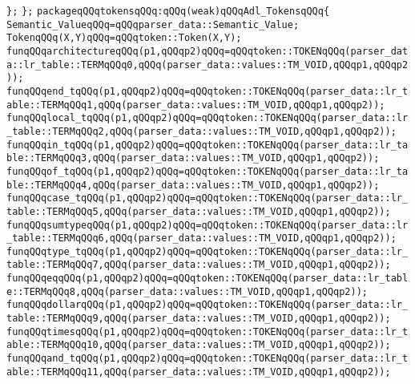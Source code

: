 \verb|};|\newline
\verb|};|\newline
\verb|packageqQQqtokensqQQq:qQQq(weak)qQQqAdl_TokensqQQq{|\newline
\verb|Semantic_ValueqQQq=qQQqparser_data::Semantic_Value;|\newline
\verb|TokenqQQq(X,Y)qQQq=qQQqtoken::Token(X,Y);|\newline
\verb|funqQQqarchitectureqQQq(p1,qQQqp2)qQQq=qQQqtoken::TOKENqQQq(parser_data::lr_table::TERMqQQq0,qQQq(parser_data::values::TM_VOID,qQQqp1,qQQqp2));|\newline
\verb|funqQQqend_tqQQq(p1,qQQqp2)qQQq=qQQqtoken::TOKENqQQq(parser_data::lr_table::TERMqQQq1,qQQq(parser_data::values::TM_VOID,qQQqp1,qQQqp2));|\newline
\verb|funqQQqlocal_tqQQq(p1,qQQqp2)qQQq=qQQqtoken::TOKENqQQq(parser_data::lr_table::TERMqQQq2,qQQq(parser_data::values::TM_VOID,qQQqp1,qQQqp2));|\newline
\verb|funqQQqin_tqQQq(p1,qQQqp2)qQQq=qQQqtoken::TOKENqQQq(parser_data::lr_table::TERMqQQq3,qQQq(parser_data::values::TM_VOID,qQQqp1,qQQqp2));|\newline
\verb|funqQQqof_tqQQq(p1,qQQqp2)qQQq=qQQqtoken::TOKENqQQq(parser_data::lr_table::TERMqQQq4,qQQq(parser_data::values::TM_VOID,qQQqp1,qQQqp2));|\newline
\verb|funqQQqcase_tqQQq(p1,qQQqp2)qQQq=qQQqtoken::TOKENqQQq(parser_data::lr_table::TERMqQQq5,qQQq(parser_data::values::TM_VOID,qQQqp1,qQQqp2));|\newline
\verb|funqQQqsumtypeqQQq(p1,qQQqp2)qQQq=qQQqtoken::TOKENqQQq(parser_data::lr_table::TERMqQQq6,qQQq(parser_data::values::TM_VOID,qQQqp1,qQQqp2));|\newline
\verb|funqQQqtype_tqQQq(p1,qQQqp2)qQQq=qQQqtoken::TOKENqQQq(parser_data::lr_table::TERMqQQq7,qQQq(parser_data::values::TM_VOID,qQQqp1,qQQqp2));|\newline
\verb|funqQQqeqqQQq(p1,qQQqp2)qQQq=qQQqtoken::TOKENqQQq(parser_data::lr_table::TERMqQQq8,qQQq(parser_data::values::TM_VOID,qQQqp1,qQQqp2));|\newline
\verb|funqQQqdollarqQQq(p1,qQQqp2)qQQq=qQQqtoken::TOKENqQQq(parser_data::lr_table::TERMqQQq9,qQQq(parser_data::values::TM_VOID,qQQqp1,qQQqp2));|\newline
\verb|funqQQqtimesqQQq(p1,qQQqp2)qQQq=qQQqtoken::TOKENqQQq(parser_data::lr_table::TERMqQQq10,qQQq(parser_data::values::TM_VOID,qQQqp1,qQQqp2));|\newline
\verb|funqQQqand_tqQQq(p1,qQQqp2)qQQq=qQQqtoken::TOKENqQQq(parser_data::lr_table::TERMqQQq11,qQQq(parser_data::values::TM_VOID,qQQqp1,qQQqp2));|\newline
